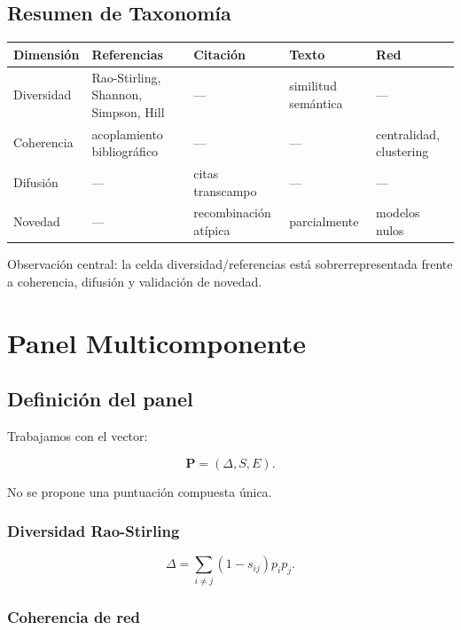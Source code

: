 \documentclass[
]{article}
\begin{document}
\hypertarget{resumen-de-taxonomuxeda}{%
\subsection{Resumen de Taxonomía}\label{resumen-de-taxonomuxeda}}

\begin{longtable}[]{@{}lllll@{}}
\toprule
Dimensión & Referencias & Citación & Texto & Red \\
\midrule
\endhead
Diversidad & Rao-Stirling, Shannon, Simpson, Hill & --- & similitud
semántica & --- \\
Coherencia & acoplamiento bibliográfico & --- & --- & centralidad,
clustering \\
Difusión & --- & citas transcampo & --- & --- \\
Novedad & --- & recombinación atípica & parcialmente & modelos nulos \\
\bottomrule
\end{longtable}

Observación central: la celda diversidad/referencias está
sobrerrepresentada frente a coherencia, difusión y validación de
novedad.

\hypertarget{panel-multicomponente}{%
\section{Panel Multicomponente}\label{panel-multicomponente}}

\hypertarget{definiciuxf3n-del-panel}{%
\subsection{Definición del panel}\label{definiciuxf3n-del-panel}}

Trabajamos con el vector:

\[\mathbf P = (\Delta, S, E).\]

No se propone una puntuación compuesta única.

\hypertarget{diversidad-rao-stirling}{%
\subsubsection{Diversidad Rao-Stirling}\label{diversidad-rao-stirling}}

\[\Delta = \sum_{i \neq j}(1-s_{ij})p_ip_j.\]

\hypertarget{coherencia-de-red}{%
\subsubsection{Coherencia de red}\label{coherencia-de-red}}
\end{document}
